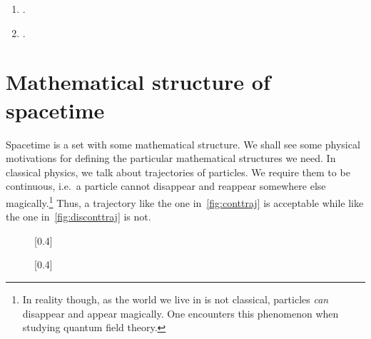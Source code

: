 \documentclass[a4 paper, 12pt]{book}
\theoremstyle{definition}
\begin{document}
    \begin{enumerate}
        \item {}.
        \item {}.
    \end{enumerate}

    \section{Mathematical structure of spacetime}

    Spacetime is a set with some mathematical structure. We shall see some physical motivations for defining the particular mathematical structures we need. In classical physics, we talk about trajectories of particles. We require them to be continuous, i.e.\ a particle cannot disappear and reappear somewhere else magically.\footnote{In reality though, as the world we live in is not classical, particles \textit{can} disappear and appear magically. One encounters this phenomenon when studying quantum field theory.} Thus, a trajectory like the one in~\cref{fig:conttraj} is acceptable while like the one in~\cref{fig:disconttraj} is not.

    \begin{figure}[htb]
        \centering
        [0.4\textwidth]
        {
        }
        \qquad
        [0.4\textwidth]
        {
        }
        \label{fig:traj}
    \end{figure}
\end{document}
